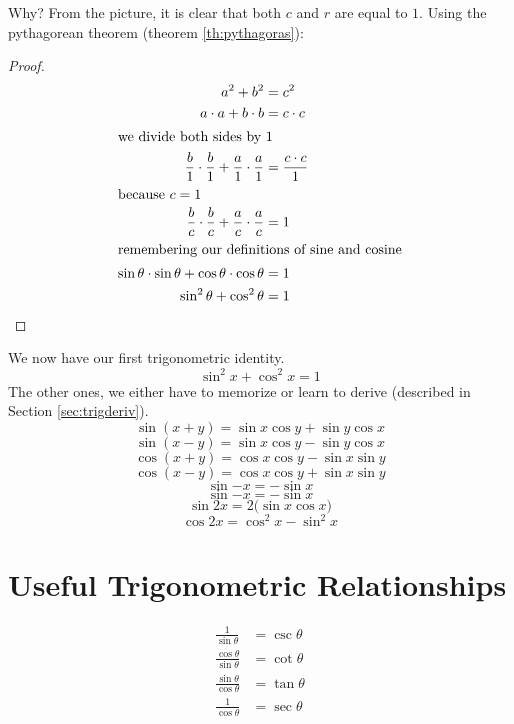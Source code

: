 Why? From the picture, it is clear that both $c$ and $r$ are equal to $1$. Using the pythagorean theorem (theorem \ref{th:pythagoras}):
\begin{proof}\begin{align*}
  a^2+b^2&=c^2\\
  a\cdot a + b \cdot b &= c \cdot c \\
  \intertext{we divide both sides by 1}
  \frac{b}{1}\cdot\frac{b}{1}+\frac{a}{1}\cdot\frac{a}{1}
  &=\frac{c \cdot c}{1}\\
  \intertext{because $c=1$}
  \frac{b}{c}\cdot\frac{b}{c}+\frac{a}{c}\cdot\frac{a}{c}
  &=1\\
  \intertext{remembering our definitions of sine and cosine}
  \sin\theta \cdot \sin\theta + \cos\theta \cdot \cos\theta &=1\\
  \sin^2\theta + \cos^2\theta &=1\qedhere
\end{align*}\end{proof}
We now have our first trigonometric identity.
\begin{equation}
  \sin^2x+\cos^2x=1
  \label{eq:pythtrig}
\end{equation}
The other ones, we either have to memorize or learn to derive (described in Section \ref{sec:trigderiv}).
\begin{equation}
  \sin{(x+y)} = \sin x \cos y + \sin y \cos x
\end{equation}
\begin{equation}
  \sin{(x-y)} = \sin x \cos y - \sin y \cos x
\end{equation}
\begin{equation}
  \cos(x+y)=\cos x \cos y - \sin x \sin y
  \label{eq:cosxpy}
\end{equation}
\begin{equation}
  \cos(x-y)=\cos x \cos y + \sin x \sin y
\end{equation}
\begin{equation}
  \sin{-x}=-\sin x
\end{equation}
\begin{equation}
  \sin{-x}=-\sin x
\end{equation}
\begin{equation}
  \sin{2x}=2 \big( \sin x \cos x \big)
\end{equation}
\begin{equation}
  \cos{2x}=\cos^2x-\sin^2x
\end{equation}

\section{Useful Trigonometric Relationships}
\begin{align}
    \frac{1}{\sin\theta}&=\csc\theta \\
    \frac{\cos\theta}{\sin\theta}&=\cot\theta \\
    \frac{\sin\theta}{\cos\theta}&=\tan\theta \\
    \frac{1}{\cos\theta}&=\sec\theta
  \end{align}


